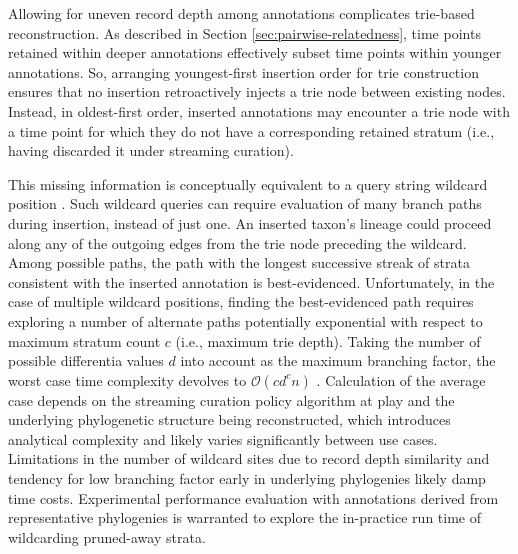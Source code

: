 Allowing for uneven record depth among annotations complicates trie-based reconstruction.
As described in Section \ref{sec:pairwise-relatedness}, time points retained within deeper annotations effectively subset time points within younger annotations.
So, arranging youngest-first insertion order for trie construction ensures that no insertion retroactively injects a trie node between existing nodes.
Instead, in oldest-first order, inserted annotations may encounter a trie node with a time point for which they do not have a corresponding retained stratum (i.e., having discarded it under streaming curation).

This missing information is conceptually equivalent to a query string wildcard position \citep{fukuyama2016partial}.
Such wildcard queries can require evaluation of many branch paths during insertion, instead of just one.
An inserted taxon's lineage could proceed along any of the outgoing edges from the trie node preceding the wildcard.
Among possible paths, the path with the longest successive streak of strata consistent with the inserted annotation is best-evidenced. 
Unfortunately, in the case of multiple wildcard positions, finding the best-evidenced path requires exploring a number of alternate paths potentially exponential with respect to maximum stratum count $c$ (i.e., maximum trie depth).
Taking the number of possible differentia values $d$ into account as the maximum branching factor, the worst case time complexity devolves to $\mathcal{O}(c d^c n)$ \citep{fukuyama2016partial}.
Calculation of the average case depends on the streaming curation policy algorithm at play and the underlying phylogenetic structure being reconstructed, which introduces analytical complexity and likely varies significantly between use cases.
Limitations in the number of wildcard sites due to record depth similarity and tendency for low branching factor early in underlying phylogenies likely damp time costs.
Experimental performance evaluation with annotations derived from representative phylogenies is warranted to explore the in-practice run time of wildcarding pruned-away strata.




